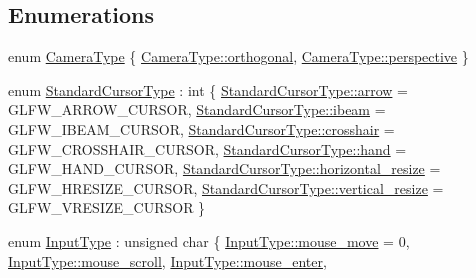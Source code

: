 \subsection*{Enumerations}
\begin{DoxyCompactItemize}
\item 
enum \mbox{\hyperlink{namespaceec_aeb1f95f6e5d6c17c5a67f68e44746ac4}{Camera\+Type}} \{ \mbox{\hyperlink{namespaceec_aeb1f95f6e5d6c17c5a67f68e44746ac4a88a486735e1314e3a3c682d2aaeba808}{Camera\+Type\+::orthogonal}}, 
\mbox{\hyperlink{namespaceec_aeb1f95f6e5d6c17c5a67f68e44746ac4ac77848cc02fefd0c360ce733a4affd93}{Camera\+Type\+::perspective}}
 \}
\item 
enum \mbox{\hyperlink{namespaceec_a067d7854be2a4a8167831d52a7224e05}{Standard\+Cursor\+Type}} \+: int \{ \newline
\mbox{\hyperlink{namespaceec_a067d7854be2a4a8167831d52a7224e05a9022a153e6190f10d9b57aa4232b8aea}{Standard\+Cursor\+Type\+::arrow}} = G\+L\+F\+W\+\_\+\+A\+R\+R\+O\+W\+\_\+\+C\+U\+R\+S\+OR, 
\mbox{\hyperlink{namespaceec_a067d7854be2a4a8167831d52a7224e05a67d5a92fabc2cc76f7cc53a8d1a0f722}{Standard\+Cursor\+Type\+::ibeam}} = G\+L\+F\+W\+\_\+\+I\+B\+E\+A\+M\+\_\+\+C\+U\+R\+S\+OR, 
\mbox{\hyperlink{namespaceec_a067d7854be2a4a8167831d52a7224e05aad90324c60706e26f566f84a1b1f55b0}{Standard\+Cursor\+Type\+::crosshair}} = G\+L\+F\+W\+\_\+\+C\+R\+O\+S\+S\+H\+A\+I\+R\+\_\+\+C\+U\+R\+S\+OR, 
\mbox{\hyperlink{namespaceec_a067d7854be2a4a8167831d52a7224e05a573ce5969e9884d49d4fab77b09a306a}{Standard\+Cursor\+Type\+::hand}} = G\+L\+F\+W\+\_\+\+H\+A\+N\+D\+\_\+\+C\+U\+R\+S\+OR, 
\newline
\mbox{\hyperlink{namespaceec_a067d7854be2a4a8167831d52a7224e05ac52fc6f9dd9fcab00272edb9adffa5ea}{Standard\+Cursor\+Type\+::horizontal\+\_\+resize}} = G\+L\+F\+W\+\_\+\+H\+R\+E\+S\+I\+Z\+E\+\_\+\+C\+U\+R\+S\+OR, 
\mbox{\hyperlink{namespaceec_a067d7854be2a4a8167831d52a7224e05a83bd12bee4ee624a3dc5476616b425e9}{Standard\+Cursor\+Type\+::vertical\+\_\+resize}} = G\+L\+F\+W\+\_\+\+V\+R\+E\+S\+I\+Z\+E\+\_\+\+C\+U\+R\+S\+OR
 \}
\item 
enum \mbox{\hyperlink{namespaceec_a5de6bdb8c4b2ed6e590e721ec998f964}{Input\+Type}} \+: unsigned char \{ \newline
\mbox{\hyperlink{namespaceec_a5de6bdb8c4b2ed6e590e721ec998f964a03f85558f24cc469dac5df2fdc8fd117}{Input\+Type\+::mouse\+\_\+move}} = 0, 
\mbox{\hyperlink{namespaceec_a5de6bdb8c4b2ed6e590e721ec998f964a6fda8ddfe16d2314d571fd69f5d5e9ff}{Input\+Type\+::mouse\+\_\+scroll}}, 
\mbox{\hyperlink{namespaceec_a5de6bdb8c4b2ed6e590e721ec998f964a41bc07e96e66c3decc6bcb84741efbd2}{Input\+Type\+::mouse\+\_\+enter}}, 

\end{DoxyCompactItemize}
